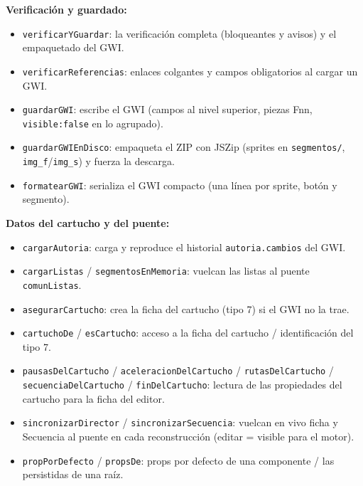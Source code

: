 \documentclass[../main.tex]{subfiles}
\begin{document}
\textbf{Verificación y guardado:}
\begin{itemize}
	\item \texttt{verificarYGuardar}: la verificación completa
	(bloqueantes y avisos) y el empaquetado del GWI.
	\item \texttt{verificarReferencias}: enlaces colgantes y campos
	obligatorios al cargar un GWI.
	\item \texttt{guardarGWI}: escribe el GWI (campos al nivel
	superior, piezas Fnn, \texttt{visible:false} en lo agrupado).
	\item \texttt{guardarGWIEnDisco}: empaqueta el ZIP con JSZip
	(sprites en \texttt{segmentos/}, \texttt{img\_f}/\texttt{img\_s})
	y fuerza la descarga.
	\item \texttt{formatearGWI}: serializa el GWI compacto (una línea
	por sprite, botón y segmento).
\end{itemize}

\textbf{Datos del cartucho y del puente:}
\begin{itemize}
	\item \texttt{cargarAutoria}: carga y reproduce el historial
	\texttt{autoria.cambios} del GWI.
	\item \texttt{cargarListas} / \texttt{segmentosEnMemoria}: vuelcan
	las listas al puente \texttt{comunListas}.
	\item \texttt{asegurarCartucho}: crea la ficha del cartucho (tipo 7)
	si el GWI no la trae.
	\item \texttt{cartuchoDe} / \texttt{esCartucho}: acceso a la ficha
	del cartucho / identificación del tipo 7.
	\item \texttt{pausasDelCartucho} / \texttt{aceleracionDelCartucho}
	/ \texttt{rutasDelCartucho} / \texttt{secuenciaDelCartucho} /
	\texttt{finDelCartucho}: lectura de las propiedades del cartucho
	para la ficha del editor.
	\item \texttt{sincronizarDirector} /
	\texttt{sincronizarSecuencia}: vuelcan en vivo ficha y Secuencia al
	puente en cada reconstrucción (editar = visible para el motor).
	\item \texttt{propPorDefecto} / \texttt{propsDe}: props por defecto
	de una componente / las persistidas de una raíz.
\end{itemize}
\end{document}
